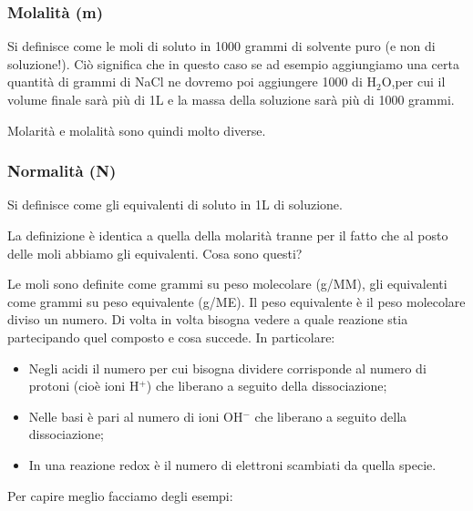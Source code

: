 \subsubsection{Molalità (m)}
Si definisce come le moli di soluto in 1000 grammi di solvente puro (e non di soluzione!). Ciò significa che in questo caso se ad esempio aggiungiamo una certa quantità di grammi di NaCl ne dovremo poi aggiungere 1000 di H$_2$O,per cui il volume finale sarà più di 1L e la massa della soluzione sarà più di 1000 grammi.

Molarità e molalità sono quindi molto diverse.
\subsubsection{Normalità (N)}
Si definisce come gli equivalenti di soluto in 1L di soluzione.

La definizione è identica a quella della molarità tranne per il fatto che al posto delle moli abbiamo gli equivalenti. Cosa sono questi?

Le moli sono definite come grammi su peso molecolare (g/MM), gli equivalenti come grammi su peso equivalente (g/ME). Il peso equivalente è il peso molecolare diviso un numero. Di volta in volta bisogna vedere a quale reazione stia partecipando quel composto e cosa succede. In particolare:
\begin{itemize}
    \item Negli acidi il numero per cui bisogna dividere corrisponde al numero di protoni (cioè ioni H$^+$) che liberano a seguito della dissociazione;
    \item Nelle basi è pari al numero di ioni OH$^-$ che liberano a seguito della dissociazione;
    \item In una reazione redox è il numero di elettroni scambiati da quella specie.
\end{itemize}

Per capire meglio facciamo degli esempi:

